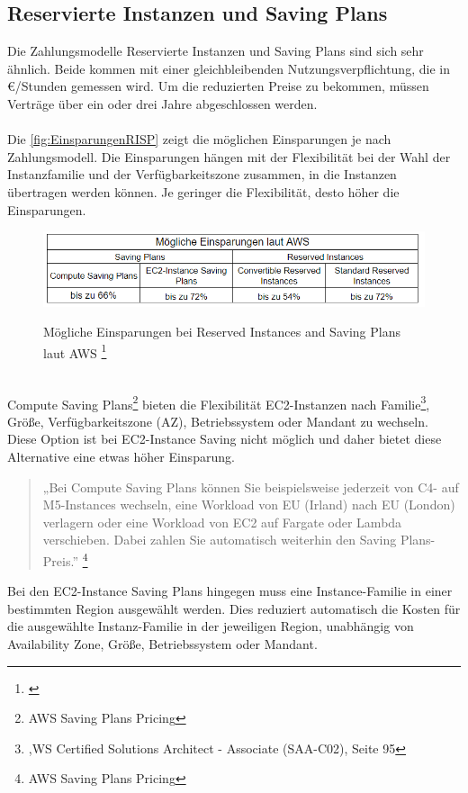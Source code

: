 \subsection{Reservierte Instanzen und Saving Plans}
Die Zahlungsmodelle Reservierte Instanzen und Saving Plans sind sich sehr ähnlich. Beide kommen mit einer gleichbleibenden  Nutzungsverpflichtung, die in €/Stunden gemessen wird. Um die reduzierten Preise  zu bekommen, müssen Verträge über ein oder drei Jahre abgeschlossen werden. 
\\\\
Die \autoref{fig:EinsparungenRISP} zeigt die möglichen Einsparungen je nach Zahlungsmodell. Die Einsparungen hängen mit der Flexibilität bei der Wahl der Instanzfamilie und der Verfügbarkeitszone zusammen, in die Instanzen übertragen werden können. Je geringer die Flexibilität, desto höher die Einsparungen.
\begin{figure}[h!]
  \centering
  \includegraphics[scale=0.8]{sources/EinsparungenRISP}\label{fig:EinsparungenRISP}\\
  \caption[Mögliche Einsparungen bei Reserved Instances and Saving Plans laut AWS]{}
  \label{fig:EinsparungenRISP}
  Mögliche Einsparungen bei Reserved Instances and Saving Plans laut AWS
  \footnote{\cite{AMZ07,AMZ11}}
\end{figure}
\\
Compute Saving Plans\footnote{\cite{AMZ11}AWS Saving Plans Pricing} bieten die Flexibilität EC2-Instanzen nach Familie\footnote{\cite{AWS1},WS Certified Solutions Architect - Associate (SAA-C02), Seite 95}, Größe, Verfügbarkeitszone (AZ), Betriebssystem oder Mandant zu wechseln. Diese Option ist bei EC2-Instance Saving nicht möglich und daher bietet diese Alternative eine etwas höher Einsparung.
\begin{quote}
    „Bei Compute Saving Plans können Sie beispielsweise jederzeit von C4- auf M5-Instances wechseln, eine Workload von EU (Irland) nach EU (London) verlagern oder eine Workload von EC2 auf Fargate oder Lambda verschieben. Dabei zahlen Sie automatisch weiterhin den Saving Plans-Preis.”
    \footnote{\cite{AMZ11}AWS Saving Plans Pricing}
\end{quote}
Bei den EC2-Instance Saving Plans hingegen muss eine Instance-Familie in einer bestimmten Region ausgewählt werden.  Dies reduziert automatisch die Kosten für die ausgewählte Instanz-Familie in der jeweiligen Region, unabhängig von Availability Zone, Größe, Betriebssystem oder Mandant.

